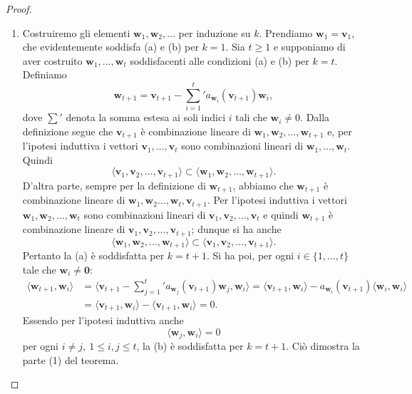 \documentclass{article}
\theoremstyle{plain}
\theoremstyle{definition}
\theoremstyle{remark}
\begin{document}
\begin{proof}\hfill
\begin{enumerate}
    \item Costruiremo gli elementi $\mathbf{w}_1, \mathbf{w}_2, \ldots$ per induzione su $k$. Prendiamo $\mathbf{w}_1 = \mathbf{v}_1$, 
    che evidentemente soddisfa (a) e (b) per $k = 1$.
    Sia $t \geq 1$ e supponiamo di aver costruito $\mathbf{w}_1, \ldots, \mathbf{w}_t$ soddisfacenti alle condizioni (a) e (b) per $k = t$. 
    Definiamo 
    \[\mathbf{w}_{t+1} = \mathbf{v}_{t+1} - \sum^t_{i=1}{}' a_{\mathbf{w}_i}(\mathbf{v}_{t+1}) \mathbf{w}_i,\]
    dove $\sum'$ denota la somma estesa ai soli indici $i$ tali che $\mathbf{w}_i \neq 0$.
    Dalla definizione segue che $\mathbf{v}_{t+1}$ è combinazione lineare di $\mathbf{w}_1, \mathbf{w}_2, \ldots, \mathbf{w}_{t+1}$ e, per 
    l'ipotesi induttiva i vettori $\mathbf{v}_1, \ldots, \mathbf{v}_t$ sono combinazioni lineari di $\mathbf{w}_1, \ldots, \mathbf{w}_{t}$. 
    Quindi \[\langle \mathbf{v}_1, \mathbf{v}_2, \ldots, \mathbf{v}_{t+1} \rangle \subset \langle \mathbf{w}_1, \mathbf{w}_2, \ldots, \mathbf{w}_{t+1} \rangle.\]
    D'altra parte, sempre per la definizione di $\mathbf{w}_{t+1}$, abbiamo che $\mathbf{w}_{t+1}$ è combinazione lineare di 
    $\mathbf{w}_1, \mathbf{w}_2 \ldots, \mathbf{w}_t, \mathbf{v}_{t+1}$.
    Per l'ipotesi induttiva i vettori $\mathbf{w}_1, \mathbf{w}_2, \ldots, \mathbf{w}_t$ sono combinazioni lineari 
    di $\mathbf{v}_1, \mathbf{v}_2, \ldots, \mathbf{v}_t$ e quindi $\mathbf{w}_{t+1}$ è combinazione lineare di $\mathbf{v}_1, \mathbf{v}_2, \ldots, \mathbf{v}_{t+1}$; dunque si ha anche
    \[\langle \mathbf{w}_1, \mathbf{w}_2, \ldots, \mathbf{w}_{t+1} \rangle \subset \langle \mathbf{v}_1, \mathbf{v}_2, \ldots, \mathbf{v}_{t+1} \rangle.\]
    Pertanto la (a) è soddisfatta per $k = t+1$.
    Si ha poi, per ogni $i\in\{1, \ldots, t\}$ tale che $\mathbf{w}_i \neq \mathbf{0}$:
    \begin{align*}
        \langle \mathbf{w}_{t+1}, \mathbf{w}_i \rangle &= \langle \mathbf{v}_{t+1} - \sum_{j=1}^{t}{}' a_{\mathbf{w}_j}(\mathbf{v}_{t+1}) \mathbf{w}_j, \mathbf{w}_i \rangle = \langle \mathbf{v}_{t+1}, \mathbf{w}_i \rangle - a_{\mathbf{w}_i}(\mathbf{v}_{t+1}) \langle \mathbf{w}_i, \mathbf{w}_i \rangle\\
            &= \langle \mathbf{v}_{t+1}, \mathbf{w}_i \rangle - \langle \mathbf{v}_{t+1}, \mathbf{w}_i \rangle = 0.
    \end{align*}
    Essendo per l'ipotesi induttiva anche 
    \[
    \langle \mathbf{w}_j, \mathbf{w}_i \rangle = 0
    \]
    per ogni $i \neq j, \ 1 \leq i, j \leq t$, la (b) è soddisfatta per $k = t+1$. Ciò dimostra la parte (1) del teorema.


\end{enumerate}
\end{proof}
\end{document}
